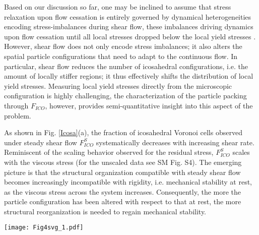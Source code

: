 \documentclass[%
preprint,
 amsmath,amssymb,
 aps,
]{revtex4-1}
\begin{document}
{{Based on our discussion so far, one may be inclined to assume that stress relaxation upon flow cessation is entirely governed by dynamical heterogeneities encoding stress-imbalances during shear flow, these imbalances driving dynamics upon flow cessation until all local stresses dropped below the local yield stresses \cite{cuny2021microscopic,cuny2022dynamics}. However, shear flow does not only encode stress imbalances; it also alters the spatial particle configurations that need to adapt to the continuous flow. In particular, shear flow reduces the number of icosahedral configurations, i.e. the amount of locally stiffer regions; it thus effectively shifts the distribution of local yield stresses. Measuring local yield stresses directly from the microscopic configuration is highly challenging, the characterization of the particle packing through  $F_{ICO}$, however, provides semi-quantitative insight into this aspect of the problem.

As shown in Fig. \ref{Icosa}(a), the fraction of icosahedral Voronoi cells observed under steady shear flow $F_{ICO}^{S}$ systematically decreases with increasing shear rate.  Reminiscent of the scaling behavior observed for the residual stress, $F_{ICO}^{S}$ scales with the viscous stress (for the unscaled data see SM Fig. S4).  
The emerging picture is that the structural organization compatible with steady shear flow becomes increasingly incompatible with rigidity, i.e. mechanical stability at rest, as the viscous stress across the system increases. Consequently, the more the particle configuration has been altered with respect to that at rest, the more structural reorganization is needed to regain mechanical stability.   


\begin{figure*}[h!]
\centering
\texttt{[image: Fig4svg\_1.pdf]}
\caption{\label{Icosa} {\bf Flow-induced weakening of particle configurations determining the magnitude of residual stresses upon flow cessation.} {\bf(a)} Main graph: fraction of Voronoi cells with icosahedral configuration obtained during steady shear $F_{ICO}^{S}$ as a function of the viscous stress normalized by the yield stress. Blue triangles down denote the data obtained for $\zeta = 5$  $\uptau_o \epsilon/a^2$, red diamonds denote the data obtained for $\zeta = 1$  $\uptau_o \epsilon/a^2$. Inset: magnitude of stress relaxation $\Delta \sigma$ normalized by the yield stress as a function of the magnitude of the changes in $F_{ICO}$ observed after application of larger shear rates (see Fig. \ref{Icosa}(b)).  
{\bf(b)}  Temporal evolution of $F_{ICO}$ upon flow cessation obtained for  $\zeta = 1$  $\uptau_o \epsilon/a^2$. From top to bottom: the preshear rate is $\dot{\gamma} = 10^{-4}, 10^{-3}, 10^{-2}, 10^{-1}, 10^{0}$ $\uptau_o^{-1}$. }
\end{figure*}

}}
\end{document}
